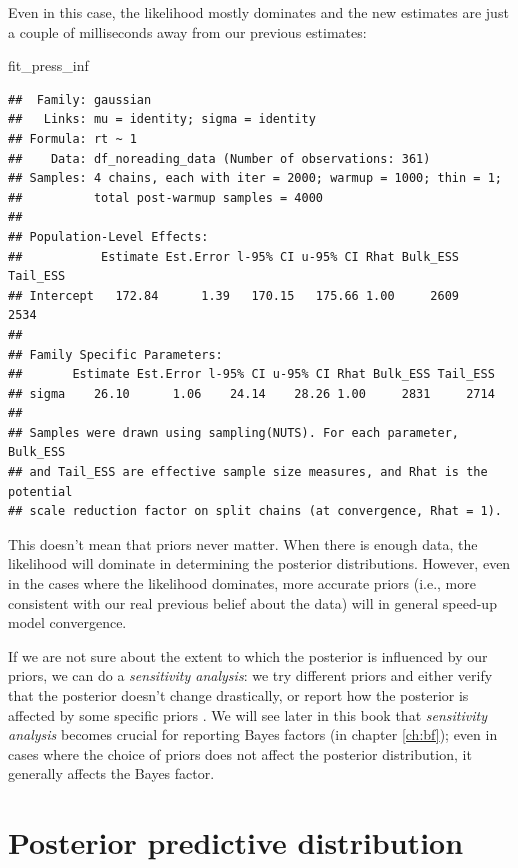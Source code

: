 \documentclass[12pt,]{krantz}
\newenvironment{Shaded}{\begin{snugshade}}{\end{snugshade}}
\newcommand{\NormalTok}[1]{#1}
\theoremstyle{definition}
\theoremstyle{definition}
\theoremstyle{definition}
\theoremstyle{remark}
\begin{document}
Even in this case, the likelihood mostly dominates and the new estimates are just a couple of milliseconds away from our previous estimates:

\begin{Shaded}
\begin{Highlighting}[]
\NormalTok{fit_press_inf}
\end{Highlighting}
\end{Shaded}

\begin{verbatim}
##  Family: gaussian 
##   Links: mu = identity; sigma = identity 
## Formula: rt ~ 1 
##    Data: df_noreading_data (Number of observations: 361) 
## Samples: 4 chains, each with iter = 2000; warmup = 1000; thin = 1;
##          total post-warmup samples = 4000
## 
## Population-Level Effects: 
##           Estimate Est.Error l-95% CI u-95% CI Rhat Bulk_ESS Tail_ESS
## Intercept   172.84      1.39   170.15   175.66 1.00     2609     2534
## 
## Family Specific Parameters: 
##       Estimate Est.Error l-95% CI u-95% CI Rhat Bulk_ESS Tail_ESS
## sigma    26.10      1.06    24.14    28.26 1.00     2831     2714
## 
## Samples were drawn using sampling(NUTS). For each parameter, Bulk_ESS
## and Tail_ESS are effective sample size measures, and Rhat is the potential
## scale reduction factor on split chains (at convergence, Rhat = 1).
\end{verbatim}

This doesn't mean that priors never matter. When there is enough data, the likelihood will dominate in determining the posterior distributions. However, even in the cases where the likelihood dominates, more accurate priors (i.e., more consistent with our real previous belief about the data) will in general speed-up model convergence.

If we are not sure about the extent to which the posterior is influenced by our priors, we can do a \emph{sensitivity analysis}: we try different priors and either verify that the posterior doesn't change drastically, or report how the posterior is affected by some specific priors \citep[for a published example in psycholinguistics, see][]{vasishthProcessingChineseRelative2013}. We will see later in this book that \emph{sensitivity analysis} becomes crucial for reporting Bayes factors (in chapter \ref{ch:bf}); even in cases where the choice of priors does not affect the posterior distribution, it generally affects the Bayes factor.

\hypertarget{sec:ppd}{%
\section{Posterior predictive distribution}\label{sec:ppd}}
\end{document}
